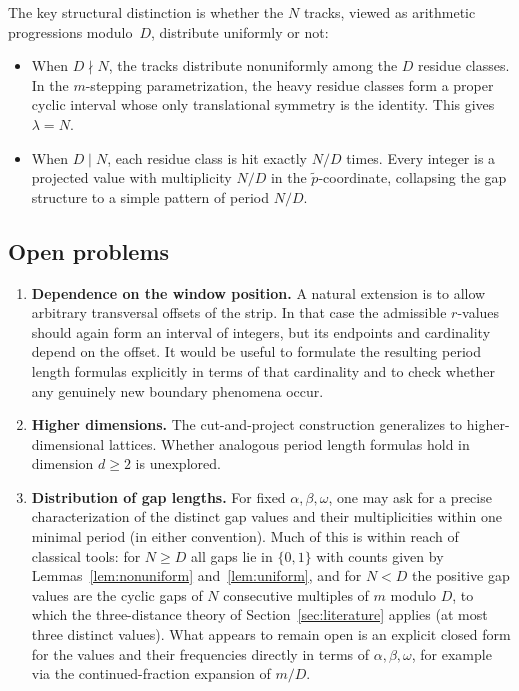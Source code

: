 \documentclass[11pt,reqno]{amsart}
\theoremstyle{plain}
\theoremstyle{definition}
\theoremstyle{remark}
\begin{document}
The key structural distinction is whether the \(N\) tracks, viewed as
arithmetic progressions modulo~\(D\), distribute uniformly or not:
\begin{itemize}
    \item When \(D \nmid N\), the tracks distribute nonuniformly among the
          \(D\) residue classes.  In the \(m\)-stepping parametrization, the
          heavy residue classes form a proper cyclic interval whose only
          translational symmetry is the identity.  This gives
          \(\lambda = N\).
    \item When \(D \mid N\), each residue class is hit exactly \(N/D\) times.
          Every integer is a projected value with multiplicity \(N/D\) in the
          \(\tilde{p}\)-coordinate, collapsing the gap structure to a simple
          pattern of period \(N/D\).
\end{itemize}

\subsection{Open problems}

\begin{enumerate}
    \item \textbf{Dependence on the window position.}
    A natural extension is to allow arbitrary transversal offsets of
    the strip.  In that case the admissible \(r\)-values should again
    form an interval of integers, but its endpoints and cardinality
    depend on the offset.  It would be useful to formulate the
    resulting period length formulas explicitly in terms of that cardinality
    and to check whether any genuinely new boundary phenomena occur.

    \item \textbf{Higher dimensions.}
    The cut-and-project construction generalizes to higher-dimensional
    lattices.  Whether analogous period length formulas hold in dimension
    \(d \ge 2\) is unexplored.

    \item \textbf{Distribution of gap lengths.}
    For fixed \(\alpha, \beta, \omega\), one may ask for a precise
    characterization of the distinct gap values and their multiplicities
    within one minimal period (in either convention).  Much of this is
    within reach of classical tools: for \(N \ge D\) all gaps lie in
    \(\{0, 1\}\) with counts given by
    Lemmas~\ref{lem:nonuniform} and~\ref{lem:uniform}, and for
    \(N < D\) the positive gap values are the cyclic gaps of \(N\)
    consecutive multiples of \(m\) modulo \(D\), to which the
    three-distance theory of Section~\ref{sec:literature} applies (at
    most three distinct values).  What appears to remain open is an
    explicit closed form for the values and their frequencies directly
    in terms of \(\alpha, \beta, \omega\), for example via the
    continued-fraction expansion of \(m/D\).
\end{enumerate}
\end{document}
